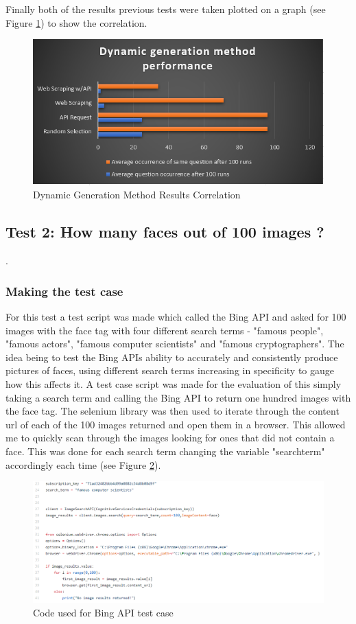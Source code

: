 \documentclass[12pt,a4paper]{article}
\begin{document}
Finally both of the results previous tests were taken plotted on a graph  (see Figure \ref{r3}) to show the correlation.

\begin{figure}[!ht]
    \centering
    \includegraphics[width=1.0\textwidth]{Figs/results3.PNG} 
    \caption{Dynamic Generation Method Results Correlation} 
    \label{r3}
\end{figure} 

\subsection{Test 2: How many faces out of 100 images ?}.   
\subsubsection{Making the test case}
For this test a test script was made which called the Bing API and asked for 100 images with the face tag with four different search terms - "famous people", "famous actors", "famous computer scientists" and "famous cryptographers". The idea being to test the Bing APIs ability to accurately and consistently produce pictures of faces, using different search terms increasing in specificity to gauge how this affects it. A test case script was made for the evaluation of this simply taking a search term and calling the Bing API to return one hundred images with the face tag. The selenium library was then used to iterate through the content url of each of the 100 images returned and open them in a browser. This allowed me to quickly scan through the images looking for ones that did not contain a face. This was done for each search term changing the variable "search\textunderscore term" accordingly each time (see Figure \ref{bingevc}).  

\begin{figure}[!ht]
    \centering
    \includegraphics[width=1.0\textwidth]{Figs/bingevcode.PNG} 
    \caption{Code used for Bing API test case} 
    \label{bingevc}
\end{figure} 
\end{document}
